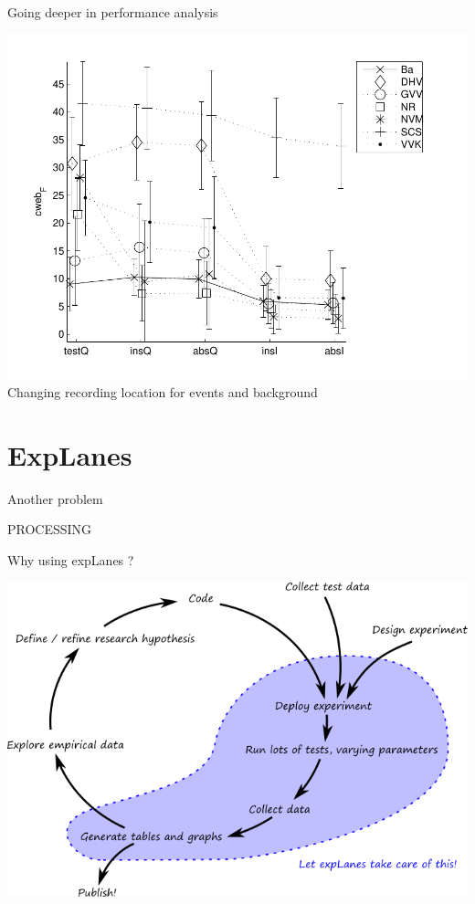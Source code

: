 \documentclass[compress]{beamer}
\begin{document}
\begin{frame}{Going deeper in performance analysis}
\begin{center}
\includegraphics[width=.8\columnwidth]{../figures/irccyn} \\
Changing recording location for events and background
\end{center}
\end{frame}


\section{ExpLanes}

\begin{frame}{Another problem}
\begin{center}
\huge PROCESSING
\end{center}
\end{frame}

\begin{frame}{Why using expLanes ?}
\begin{center}
\includegraphics[width=.9\columnwidth]{figures/workflow} \\
\end{center}
\end{frame}
\end{document}
